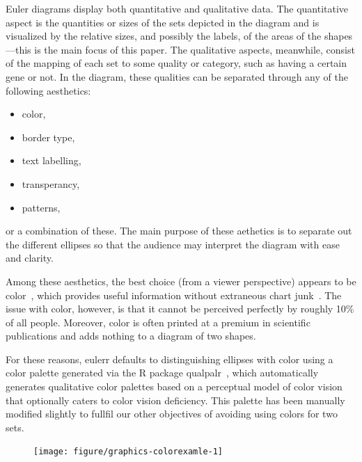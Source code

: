 \documentclass[
  oneside,
  openany,
  numbers=noendperiod,
  parskip=half,
  bibliography=totoc
]{scrbook}\usepackage[]{graphicx}\usepackage{xcolor}
\newenvironment{knitrout}{}{} %
\newcommand{\pkg}[1]{{\fontseries{b}\selectfont #1}}
\begin{document}
Euler diagrams display both quantitative and qualitative data. The quantitative
aspect is the quantities or sizes of the sets depicted in the diagram and is
visualized by the relative sizes, and possibly the labels, of the areas of the
shapes---this is the main focus of this paper. The qualitative aspects,
meanwhile, consist of the mapping of each set to some quality or category, such
as having a certain gene or not. In the diagram, these qualities can be
separated through any of the following aesthetics:
%
\begin{itemize}
\item color,
\item border type,
\item text labelling,
\item transperancy,
\item patterns,
\end{itemize}
%
or a combination of these. The main purpose of these aethetics is to separate
out the different ellipses so that the audience may interpret the diagram with
ease and clarity.

Among these aesthetics, the best choice (from a viewer perspective) appears to
be color~\citep{blake_2016}, which provides useful information without
extraneous chart junk~\citep{tufte_2001}. The issue with color, however, is that
it cannot be perceived perfectly by roughly 10\% of all people. Moreover, color
is often printed at a premium in scientific publications and adds nothing to a
diagram of two shapes.

For these reasons, \pkg{eulerr} defaults to distinguishing ellipses with color
using a color palette generated via the R package
\pkg{qualpalr}~\citep{larsson_2016}, which automatically generates qualitative
color palettes based on a perceptual model of color vision that optionally
caters to color vision deficiency. This palette has been manually modified
slightly to fullfil our other objectives of avoiding using colors for two sets.

\begin{figure}
\begin{knitrout}\small
{}\color{fgcolor}

{\centering \texttt{[image: figure/graphics-colorexamle-1]} 

}



\end{knitrout}
\label{fig:colorexample}
\end{figure}
\end{document}
